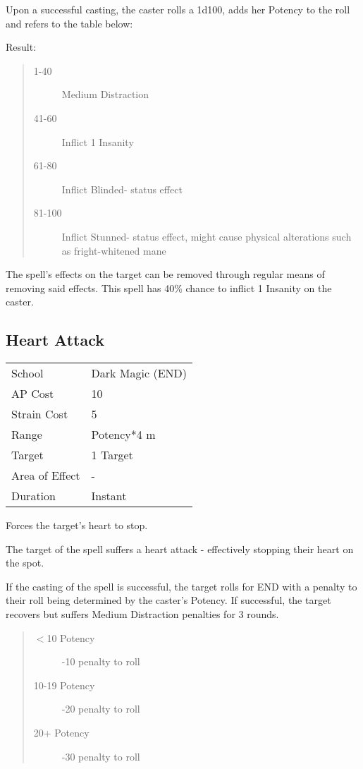 \documentclass[11pt,a4paper,twocolumn]{book}
\begin{document}
Upon a successful casting, the caster rolls a 1d100, adds her Potency to the roll and refers to the table below:

Result:
\begin{quote}
	\begin{description}
		\item [1-40]		Medium Distraction
		\item [41-60]		Inflict 1 Insanity
		\item [61-80]		Inflict Blinded- status effect 
		\item [81-100]		Inflict Stunned- status effect, might cause physical alterations such as fright-whitened mane
	\end{description}
\end{quote}

The spell's effects on the target can be removed through regular means of removing said effects.
This spell has 40\% chance to inflict 1 Insanity on the caster.

\subsection*{Heart Attack}
{
	\begin{tabu} to 75mm{| X[l,4] | X[l,7] |}
		\hline
		School 			& Dark Magic (END) 		\\
		AP Cost	      	& 10 					\\
		Strain Cost     & 5 					\\
		Range     		& Potency*4 m			\\
		Target      	& 1 Target				\\
		Area of Effect  & -  	 				\\
		Duration     	& Instant 				\\ \hline
	\end{tabu}
	
}

\medskip

Forces the target's heart to stop.

The target of the spell suffers a heart attack - effectively stopping their heart on the spot.

If the casting of the spell is successful, the target rolls for END with a penalty to their roll being determined by the caster's Potency. If successful, the target recovers but suffers Medium Distraction penalties for 3 rounds.

\begin{quote}
	\begin{description}
		\item[$<$10 Potency] 	-10 penalty to roll
		\item[10-19 Potency] 	-20 penalty to roll
		\item[20+ Potency] 	-30 penalty to roll
	\end{description}
\end{quote}
\end{document}
